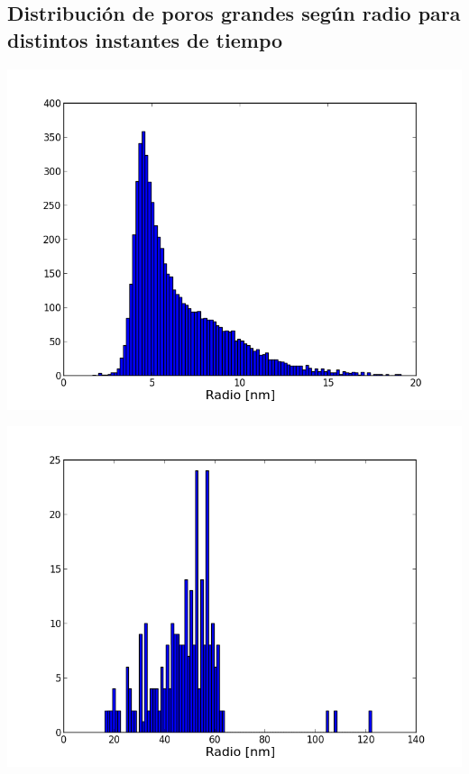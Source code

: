 \documentclass[a0,portrait]{a0poster}
\begin{document}
\begin{multicols}{2}
\subsection*{Distribución de poros grandes según radio para distintos instantes de tiempo}
	
\begin{multicols}{2}
	\begin{center}\vspace{1cm}
	\includegraphics[width=1\linewidth]{hist-radios-5e-6-50-64-160KVm}
	\end{center}\vspace{1cm}

\columnbreak

	\begin{center}\vspace{1cm}
	\includegraphics[width=1\linewidth]{hist-radios-5e-3-50-64-160KVm}
	\end{center}\vspace{1cm}
\end{multicols}


\end{multicols}
\end{document}

